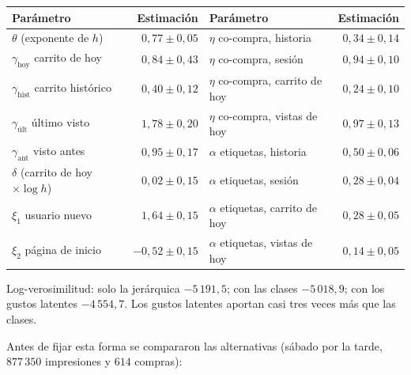 \documentclass[11pt,a4paper]{article}
\begin{document}
\begin{center}
\small
\begin{tabular}{lrlr}
\toprule
Parámetro & Estimación & Parámetro & Estimación\\
\midrule
$\theta$ (exponente de $h$) & $0{,}77\pm0{,}05$ & $\eta$ co-compra, historia & $0{,}34\pm0{,}14$\\
$\gamma_{\text{hoy}}$ carrito de hoy & $0{,}84\pm0{,}43$ & $\eta$ co-compra, sesión & $0{,}94\pm0{,}10$\\
$\gamma_{\text{hist}}$ carrito histórico & $0{,}40\pm0{,}12$ & $\eta$ co-compra, carrito de hoy & $0{,}24\pm0{,}10$\\
$\gamma_{\text{últ}}$ último visto & $1{,}78\pm0{,}20$ & $\eta$ co-compra, vistas de hoy & $0{,}97\pm0{,}13$\\
$\gamma_{\text{ant}}$ visto antes & $0{,}95\pm0{,}17$ & $\alpha$ etiquetas, historia & $0{,}50\pm0{,}06$\\
$\delta$ (carrito de hoy $\times\log h$) & $0{,}02\pm0{,}15$ & $\alpha$ etiquetas, sesión & $0{,}28\pm0{,}04$\\
$\xi_1$ usuario nuevo & $1{,}64\pm0{,}15$ & $\alpha$ etiquetas, carrito de hoy & $0{,}28\pm0{,}05$\\
$\xi_2$ página de inicio & $-0{,}52\pm0{,}15$ & $\alpha$ etiquetas, vistas de hoy & $0{,}14\pm0{,}05$\\
\bottomrule
\end{tabular}
\end{center}

Log-verosimilitud: solo la jerárquica $-5\,191{,}5$; con las clases $-5\,018{,}9$; con los gustos latentes
$-4\,554{,}7$. Los gustos latentes aportan casi tres veces más que las clases.

Antes de fijar esta forma se compararon las alternativas (sábado por la tarde, $877\,350$ impresiones y
$614$ compras):
\end{document}
